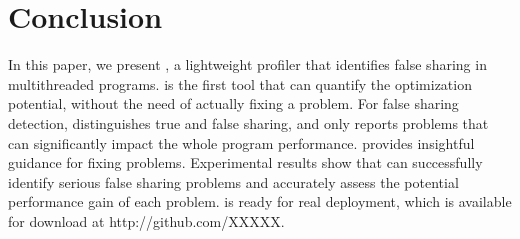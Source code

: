 \section{Conclusion}
\label{sec:conclusion}

In this paper, we present \cheetah{}, a lightweight profiler that identifies false sharing in multithreaded programs. \cheetah{} is the first tool that can quantify the optimization potential, without the need of actually fixing a problem. For false sharing detection, \cheetah{} distinguishes true and false sharing, and only reports problems that can significantly impact the whole program performance. \cheetah{} provides insightful guidance for fixing problems. Experimental results show that \cheetah{} can successfully identify serious false sharing problems and accurately assess the potential performance gain of each problem. \Cheetah{} is ready for real deployment, which is available for download at http://github.com/XXXXX.



